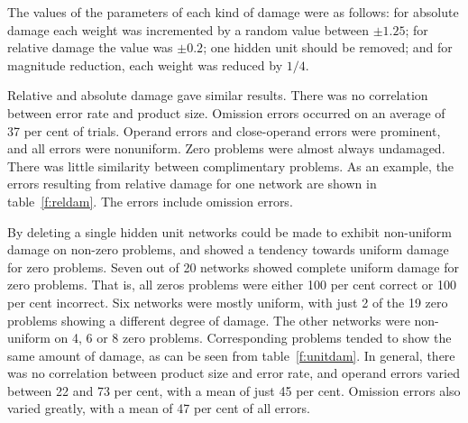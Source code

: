 The values of the parameters of each kind of damage were as follows:
for absolute damage each weight was incremented by a random value between
$\pm1.25$; for relative damage the value was $\pm0.2$; one hidden unit
should be removed; and for magnitude reduction, each weight was reduced by
$1/4$.

Relative and absolute damage gave similar results.  There was no
correlation between error rate and product size. Omission errors occurred on
an average of 37 per cent of trials.
Operand errors and
close-operand errors were prominent, and all errors were nonuniform.  Zero
problems were almost always undamaged. There was little similarity between
complimentary problems.  As an example, the errors resulting from relative
damage for one network are shown in table~\ref{f:reldam}.  The errors
include omission errors.



By deleting a single hidden unit networks could be made to exhibit
non-uniform damage on non-zero problems, and showed a
tendency towards uniform damage for zero
problems. Seven out of 20 networks showed complete uniform damage for
zero problems.
That is, all zeros problems were either 100
per cent correct or 100 per cent incorrect. Six
networks were mostly uniform, with just 2 of the 19 zero problems showing a
different degree of damage.  The other networks were non-uniform on 4, 6 or
8 zero problems. Corresponding problems tended to show the same amount of
damage, as can be seen from table~\ref{f:unitdam}.  In general, there was
no correlation between product size and error rate, and operand errors
varied between 22 and 73 per cent, with a mean of just 45 per cent.
Omission errors also varied greatly, with a mean of 47 per cent of all
errors.

